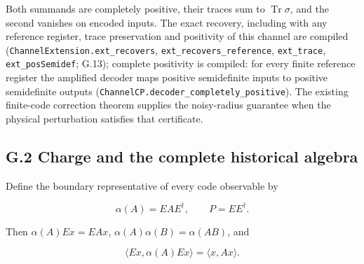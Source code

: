 \documentclass[
]{article}
\begin{document}
Both summands are completely positive, their traces sum to
\(\operatorname{Tr}\sigma\), and the second vanishes on encoded inputs.
The exact recovery, including with any reference register, trace
preservation and positivity of this channel are compiled
(\texttt{C\allowbreak{}h\allowbreak{}a\allowbreak{}n\allowbreak{}n\allowbreak{}e\allowbreak{}l\allowbreak{}E\allowbreak{}x\allowbreak{}t\allowbreak{}e\allowbreak{}n\allowbreak{}s\allowbreak{}i\allowbreak{}o\allowbreak{}n\allowbreak{}.\allowbreak{}e\allowbreak{}x\allowbreak{}t\allowbreak{}\_\allowbreak{}r\allowbreak{}e\allowbreak{}c\allowbreak{}o\allowbreak{}v\allowbreak{}e\allowbreak{}r\allowbreak{}s},
\texttt{e\allowbreak{}x\allowbreak{}t\allowbreak{}\_\allowbreak{}r\allowbreak{}e\allowbreak{}c\allowbreak{}o\allowbreak{}v\allowbreak{}e\allowbreak{}r\allowbreak{}s\allowbreak{}\_\allowbreak{}r\allowbreak{}e\allowbreak{}f\allowbreak{}e\allowbreak{}r\allowbreak{}e\allowbreak{}n\allowbreak{}c\allowbreak{}e},
\texttt{ext\_trace}, \texttt{ext\_posSemidef}; G.13); complete
positivity is compiled: for every finite reference register the
amplified decoder maps positive semidefinite inputs to positive
semidefinite outputs
(\texttt{C\allowbreak{}h\allowbreak{}a\allowbreak{}n\allowbreak{}n\allowbreak{}e\allowbreak{}l\allowbreak{}C\allowbreak{}P\allowbreak{}.\allowbreak{}d\allowbreak{}e\allowbreak{}c\allowbreak{}o\allowbreak{}d\allowbreak{}e\allowbreak{}r\allowbreak{}\_\allowbreak{}c\allowbreak{}o\allowbreak{}m\allowbreak{}p\allowbreak{}l\allowbreak{}e\allowbreak{}t\allowbreak{}e\allowbreak{}l\allowbreak{}y\allowbreak{}\_\allowbreak{}p\allowbreak{}o\allowbreak{}s\allowbreak{}i\allowbreak{}t\allowbreak{}i\allowbreak{}v\allowbreak{}e}).
The existing finite-code correction theorem supplies the noisy-radius
guarantee when the physical perturbation satisfies that certificate.

\subsection{G.2 Charge and the complete historical
algebra}\label{g.2-charge-and-the-complete-historical-algebra}

Define the boundary representative of every code observable by

\[
\alpha(A)=EAE^\dagger,\qquad P=EE^\dagger.
\]

Then \(\alpha(A)Ex=EAx\), \(\alpha(A)\alpha(B)=\alpha(AB)\), and

\[
\langle Ex,\alpha(A)Ex\rangle=\langle x,Ax\rangle.
\]
\end{document}
